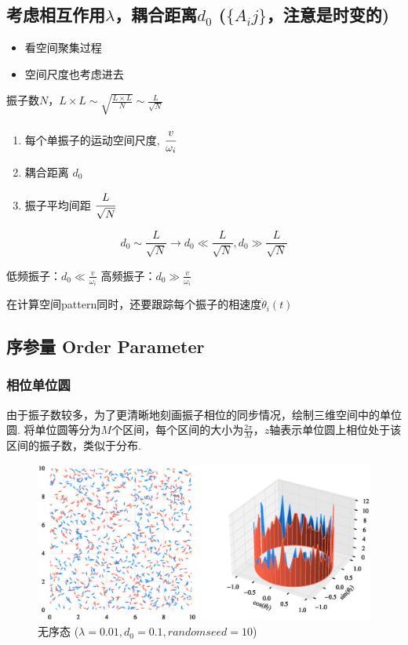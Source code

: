 \documentclass{article}
\begin{document}
\subsection{考虑相互作用$\lambda$，耦合距离$d_0$ ($\{A_ij\}$，注意是时变的)}

\begin{itemize}
    \item 看空间聚集过程
    \item 空间尺度也考虑进去
\end{itemize}

振子数$N$，$L\times L\sim \sqrt{\frac{L\times L}{N}}\sim \frac{L}{\sqrt{N}}$

\begin{enumerate}
    \item 每个单振子的运动空间尺度, $\cfrac{v}{\omega_i}$
    \item 耦合距离 $d_0$
    \item 振子平均间距 $\cfrac{L}{\sqrt{N}}$
\end{enumerate}

$$
d_0\sim \frac{L}{\sqrt{N}}\rightarrow d_0\ll \frac{L}{\sqrt{N}}, d_0\gg \frac{L}{\sqrt{N}}
$$

低频振子：$d_0\ll \frac{v}{\omega _i}$
高频振子：$d_0\gg \frac{v}{\omega _i}$

在计算空间pattern同时，还要跟踪每个振子的相速度$\dot{\theta}_i(t)$

\newpage
\subsection{序参量 Order Parameter}

\subsubsection{相位单位圆}

由于振子数较多，为了更清晰地刻画振子相位的同步情况，绘制三维空间中的单位圆. 将单位圆等分为$M$个区间，每个区间的大小为$\frac{2\pi}{M}$，$z$轴表示单位圆上相位处于该区间的振子数，类似于分布.

\begin{figure}[H]
	\centering
	\includegraphics[width=\textwidth]{./figs/CorrectCoupling_uniform_0.010_0.10.eps}
	\vspace{-1cm}
	\caption{无序态 ($\lambda=0.01, d_0=0.1, random seed=10$)}
	\label{fig:fig231.1}
\end{figure}
\end{document}
